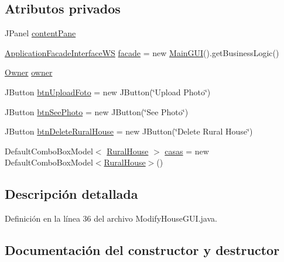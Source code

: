 \subsection*{Atributos privados}
\begin{DoxyCompactItemize}
\item 
J\+Panel \mbox{\hyperlink{classgui_1_1_modify_house_g_u_i_a7bb13be5defa74715359f06a41fb5dad}{content\+Pane}}
\item 
\mbox{\hyperlink{interfacebusiness_logic_1_1_application_facade_interface_w_s}{Application\+Facade\+Interface\+WS}} \mbox{\hyperlink{classgui_1_1_modify_house_g_u_i_a2272c7d4931bdf3dac35d8dc6496978f}{facade}} = new \mbox{\hyperlink{classgui_1_1_main_g_u_i}{Main\+G\+UI}}().get\+Business\+Logic()
\item 
\mbox{\hyperlink{classdomain_1_1_owner}{Owner}} \mbox{\hyperlink{classgui_1_1_modify_house_g_u_i_a126db8210cd615dca1929c2f258ff58c}{owner}}
\item 
J\+Button \mbox{\hyperlink{classgui_1_1_modify_house_g_u_i_a5c169d1fb8a40277b56fd291a48e97ab}{btn\+Upload\+Foto}} = new J\+Button(\char`\"{}Upload Photo\char`\"{})
\item 
J\+Button \mbox{\hyperlink{classgui_1_1_modify_house_g_u_i_a25b4d3da9ad668a5a976faf0d2518ce9}{btn\+See\+Photo}} = new J\+Button(\char`\"{}See Photo\char`\"{})
\item 
J\+Button \mbox{\hyperlink{classgui_1_1_modify_house_g_u_i_ab035400265dc2c288707e9f30fd7414f}{btn\+Delete\+Rural\+House}} = new J\+Button(\char`\"{}Delete Rural House\char`\"{})
\item 
Default\+Combo\+Box\+Model$<$ \mbox{\hyperlink{classdomain_1_1_rural_house}{Rural\+House}} $>$ \mbox{\hyperlink{classgui_1_1_modify_house_g_u_i_ae3c3ed3425d3b0bf7c1b901ae52ddcdf}{casas}} = new Default\+Combo\+Box\+Model$<$\mbox{\hyperlink{classdomain_1_1_rural_house}{Rural\+House}}$>$()
\end{DoxyCompactItemize}


\subsection{Descripción detallada}


Definición en la línea 36 del archivo Modify\+House\+G\+U\+I.\+java.



\subsection{Documentación del constructor y destructor}
\mbox{\label{classgui_1_1_modify_house_g_u_i_a4639580e463c76396d39474fbcd5cff5}} 

